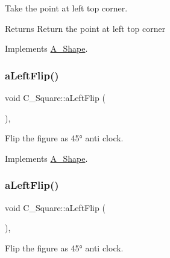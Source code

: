 Take the point at left top corner. 

\begin{DoxyReturn}{Returns}
Return the point at left top corner 
\end{DoxyReturn}


Implements \hyperlink{classA__Shape_abe6781b13037bf7ecea8ff9456b31533}{A\+\_\+\+Shape}.

\mbox{\label{classC__Square_a31d31862502f0ed24e8331af30100338}} 
\subsubsection{\texorpdfstring{a\+Left\+Flip()}{aLeftFlip()}\hspace{0.1cm}{\footnotesize\ttfamily [1/2]}}
{\footnotesize\ttfamily void C\+\_\+\+Square\+::a\+Left\+Flip (\begin{DoxyParamCaption}{ }\end{DoxyParamCaption})\hspace{0.3cm}{\ttfamily [override]}, {\ttfamily [virtual]}}



Flip the figure as 45° anti clock. 



Implements \hyperlink{classA__Shape_abe947e7003cb63be2b4f6c439533427d}{A\+\_\+\+Shape}.

\mbox{\label{classC__Square_a31d31862502f0ed24e8331af30100338}} 
\subsubsection{\texorpdfstring{a\+Left\+Flip()}{aLeftFlip()}\hspace{0.1cm}{\footnotesize\ttfamily [2/2]}}
{\footnotesize\ttfamily void C\+\_\+\+Square\+::a\+Left\+Flip (\begin{DoxyParamCaption}{ }\end{DoxyParamCaption})\hspace{0.3cm}{\ttfamily [override]}, {\ttfamily [virtual]}}



Flip the figure as 45° anti clock. 



